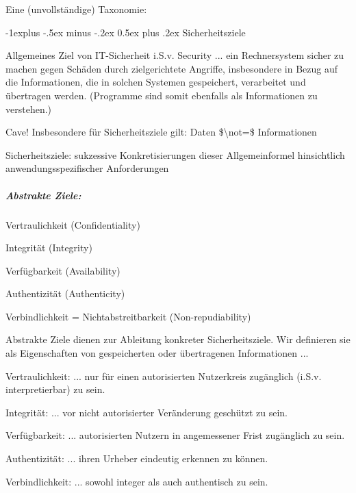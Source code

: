 \documentclass[a4paper]{article}
\makeatletter
\renewcommand{\subsection}{\@startsection{subsection}{2}{0mm}%
 {-1explus -.5ex minus -.2ex}%
 {0.5ex plus .2ex}%
 {\normalfont\normalsize\bfseries}}
\makeatother
\begin{document}
\begin{multicols}{3}
    Eine (unvollständige) Taxonomie:

    \begin{itemize*}
        \item
    \end{itemize*}


    \subsection{Sicherheitsziele}

    Allgemeines Ziel von IT-Sicherheit i.S.v. Security ... ein Rechnersystem
    sicher zu machen gegen Schäden durch zielgerichtete Angriffe,
    insbesondere in Bezug auf die Informationen, die in solchen Systemen
    gespeichert, verarbeitet und übertragen werden. (Programme sind somit
    ebenfalls als Informationen zu verstehen.)

    Cave! Insbesondere für Sicherheitsziele gilt: Daten
    \$\textbackslash not=\$ Informationen

    Sicherheitsziele: sukzessive Konkretisierungen dieser Allgemeinformel
    hinsichtlich anwendungsspezifischer Anforderungen


    \subparagraph{Abstrakte Ziele:}

    \begin{enumerate*}
        \item
        Vertraulichkeit (Confidentiality)
        \item
        Integrität (Integrity)
        \item
        Verfügbarkeit (Availability)
        \item
        Authentizität (Authenticity)
        \item
        Verbindlichkeit = Nichtabstreitbarkeit (Non-repudiability)
    \end{enumerate*}

    Abstrakte Ziele dienen zur Ableitung konkreter Sicherheitsziele. Wir
    definieren sie als Eigenschaften von gespeicherten oder übertragenen
    Informationen ...

    \begin{itemize*}
        \item
        Vertraulichkeit: ... nur für einen autorisierten Nutzerkreis
        zugänglich (i.S.v. interpretierbar) zu sein.
        \item
        Integrität: ... vor nicht autorisierter Veränderung geschützt zu sein.
        \item
        Verfügbarkeit: ... autorisierten Nutzern in angemessener Frist
        zugänglich zu sein.
        \item
        Authentizität: ... ihren Urheber eindeutig erkennen zu können.
        \item
        Verbindlichkeit: ... sowohl integer als auch authentisch zu sein.
    \end{itemize*}



\end{multicols}
\end{document}
